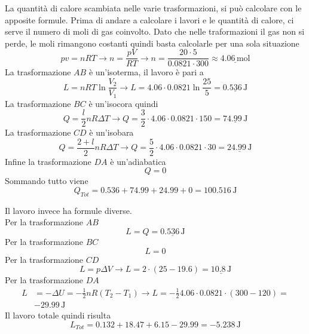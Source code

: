 La quantità di calore scambiata nelle varie trasformazioni, si può calcolare con le apposite formule.
Prima di andare a calcolare i lavori e le quantità di calore, ci serve il numero di moli di gas
coinvolto. Dato che nelle traformazioni il gas non si perde, le moli rimangono costanti quindi basta
calcolarle per una sola situazione
\begin{equation*}
  pv=nRT \rightarrow n = \frac{pV}{RT}\rightarrow n =
  \frac{20\cdot5}{0.0821\cdot300}\approx\underline{4.06\,\text{mol}}
\end{equation*}
La trasformazione $AB$ è un'isoterma, il lavoro è pari a 
\begin{equation*}
  L = nRT\ln\frac{V_2}{V_1} \rightarrow L = 4.06\cdot0.0821\ln\frac{25}{5}= \underline{0.536\,\text{J}}
\end{equation*}
La trasformazione $BC$ è un'isocora quindi
\begin{equation*}
  Q = \frac{l}{2}nR\Delta T \rightarrow Q =
  \frac{3}{2}\cdot4.06\cdot0.0821\cdot150=\underline{74.99\,\text{J}}
\end{equation*}
La trasformazione $CD$ è un'isobara
\begin{equation*}
  Q = \frac{2+l}{2}nR\Delta T\rightarrow Q =
  \frac{5}{2}\cdot4.06\cdot0.0821\cdot30=\underline{24.99\,\text{J}}
\end{equation*}
Infine la trasformazione $DA$ è un'adiabatica
\begin{equation*}
  Q = 0
\end{equation*}
Sommando tutto viene
\begin{equation*}
  Q_{Tot} = 0.536+74.99+24.99+0=\boxed{100.516\,\text{J}}
\end{equation*}

Il lavoro invece ha formule diverse.\\
Per la trasformazione $AB$
\begin{equation*}
  L=Q=\underline{0.536\,\text{J}}
\end{equation*}
Per la trasformazione $BC$
\begin{equation*}
  L=0
\end{equation*}
Per la trasformazione $CD$
\begin{equation*}
  L = p\Delta V\rightarrow L = 2\cdot(25-19.6) = \underline{10.8\,\text{J}}
\end{equation*}
Per la trasformazione $DA$
\begin{align*}
  L &= -\Delta U = -\frac{1}{2}nR(T_2-T_1) \rightarrow L = -\frac{1}{2}4.06\cdot0.0821\cdot(300-120) =\\
    &\boxed{-29.99\,\text{J}}
\end{align*}
Il lavoro totale quindi risulta
\begin{equation*}
  L_{Tot} = 0.132 + 18.47+6.15-29.99 = \boxed{-5.238\,\text{J}}
\end{equation*}

